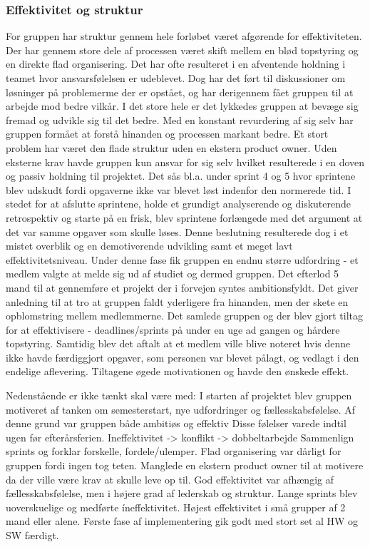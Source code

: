 \subsubsection{Effektivitet og struktur}
For gruppen har struktur gennem hele forløbet været afgørende for effektiviteten. Der har gennem store dele af processen været skift mellem en blød topstyring og en direkte flad organisering. Det har ofte resulteret i en afventende holdning i teamet hvor ansvarsfølelsen er udeblevet. Dog har det ført til diskussioner om løsninger på problemerme der er opstået, og har derigennem fået gruppen til at arbejde mod bedre vilkår. I det store hele er det lykkedes gruppen at bevæge sig fremad og udvikle sig til det bedre. Med en konstant revurdering af sig selv har gruppen formået at forstå hinanden og processen markant bedre.
Et stort problem har været den flade struktur uden en ekstern product owner. Uden eksterne krav havde gruppen kun ansvar for sig selv hvilket resulterede i en doven og passiv holdning til projektet. Det sås bl.a. under sprint 4 og 5 hvor sprintene blev udskudt fordi opgaverne ikke var blevet løst indenfor den normerede tid. I stedet for at afslutte  sprintene, holde et grundigt analyserende og diskuterende retrospektiv og starte på en frisk, blev sprintene forlængede med det argument at det var samme opgaver som skulle løses. Denne beslutning resulterede dog i et mistet overblik og en demotiverende udvikling samt et meget lavt effektivitetsniveau. Under denne fase fik gruppen en endnu større udfordring - et medlem valgte at melde sig ud af studiet og dermed gruppen. Det efterlod 5 mand til at gennemføre et projekt der i forvejen syntes ambitionsfyldt. Det giver anledning til at tro at gruppen faldt yderligere fra hinanden, men der skete en opblomstring mellem medlemmerne. Det samlede gruppen og der blev gjort tiltag for at effektivisere - deadlines/sprints på under en uge ad gangen og hårdere topstyring. Samtidig blev det aftalt at et medlem ville blive noteret hvis denne ikke havde færdiggjort opgaver, som personen var blevet pålagt, og vedlagt i den endelige aflevering. Tiltagene øgede motivationen og havde den ønskede effekt.

Nedenstående er ikke tænkt skal være med:
I starten af projektet blev gruppen motiveret af tanken om semesterstart, nye udfordringer og fællesskabsfølelse. Af denne grund var gruppen både ambitiøs og effektiv
Disse følelser varede indtil ugen før efterårsferien.
Ineffektivitet -> konflikt -> dobbeltarbejde
Sammenlign sprints og forklar forskelle, fordele/ulemper.
Flad organisering var dårligt for gruppen fordi ingen tog teten. Manglede en ekstern product owner til at motivere da der ville være krav at skulle leve op til. 
God effektivitet var afhængig af fællesskabsfølelse, men i højere grad af lederskab og struktur.
Lange sprints blev uoverskuelige og medførte íneffektivitet. 
Højest effektivitet i små grupper af 2 mand eller alene. Første fase af implementering gik godt med stort set al HW og SW færdigt. 


